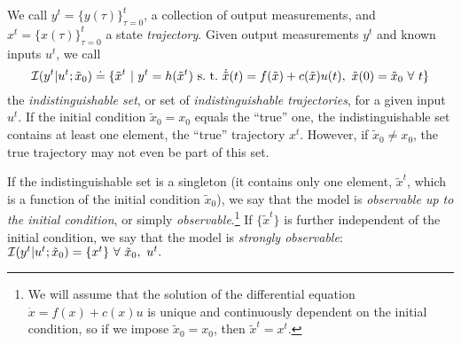 \documentclass[]{article}
\begin{document}
We call $y^t = \{y(\tau)\}_{\tau = 0}^t$, a collection of output measurements, and $x^t = \{x(\tau)\}_{\tau = 0}^t$ a state {\em trajectory}. Given output measurements $y^t$ and known inputs $u^t$, we call 
\begin{equation}
{\cal I}(y^t | u^t; \tilde x_0) \doteq \{ {\tilde x}^t \ | \ y^t = h({\tilde x}^t) \ {\rm s. \ t. } \ \dot {\tilde x}(t) = f({\tilde x}) + c({\tilde x}) u(t), \ \tilde x(0) = \tilde x_0  \ \forall \ t\}
\end{equation}
the {\em indistinguishable set}, or set of {\em indistinguishable trajectories}, for a given input $u^t$. If the initial condition $\tilde x_0 = x_0$ equals the ``true'' one, the indistinguishable set contains at least one element, the ``true'' trajectory $x^t$. However, if $\tilde x_0 \neq x_0$, the true trajectory may not even be part of this set.

If the indistinguishable set is a singleton (it contains only one element, $\tilde x^t$, which is a function of the initial condition $\tilde x_0$), we say that the model is {\em observable up to the initial condition}, or simply {\em observable}.\footnote{We will assume that the solution of the differential equation $\dot x = f(x) + c(x) u$ is unique and continuously dependent on the initial condition, so if we impose $\tilde x_0 = x_0$, then $\tilde x^t = x^t$.} If $\{\tilde x^t\}$ is further independent of the initial condition, we say that the model is {\em strongly observable}:
$
{\cal I}(y^t | u^t; \tilde x_0) = \{ x^t\} \ \forall \ \tilde x_0, \ u^t. 
$

\iffalse
If the indistinguishable set is not a singleton, but the collection of trajectories form an equivalence class under different initial conditions, we say that the model is {\em observable up to the initial condition}. For instance, we may have that $x^t$ is in the form $x(t) = \phi(t)x_0$ and indistinguishable trajectories are of the form $\tilde x(t) = \phi(t) \tilde x_0$, for the same $\phi(t)$, for all $t$. In this case, if we consider equivalent trajectories that differ solely by their initial condition, we have that the indistinguishable set is made of equivalence classes (under the Gauge transformation defined by the initial conditions), and we say that the model is observable up to the initial condition if the indistinguishable set is a single equivalence class. Note that, in this case, we can fix the initial condition arbitrarily (canonization), say to $\tilde x_0$, and obtain a singleton indistinguishable set that does {\em not} the true trajectory, but one that is related to it by {\em gauge 
transformation}. We will defer the treatment to the initial condition to Sect. \ref{sect-gauge}, and neglect $x_0$ in the meantime. 
\fi
\end{document}
